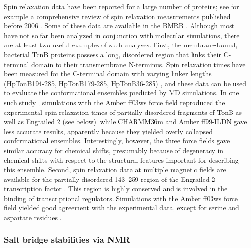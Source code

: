 \documentclass[9pt,review]{livecoms}
\begin{document}
Spin relaxation data have been reported for a large number of proteins; see for example a comprehensive review of spin relaxation measurements published before 2006 \cite{jarymowycz_fast_2006}.
Some of these data are available in the BMRB \cite{ulrich_biomagresbank_2008,romero_biomagresbank_2020}.
Although most have not so far been analyzed in conjunction with molecular simulations, there are at least two useful examples of such analyses.
First, the membrane-bound, bacterial TonB proteins possess a long, disordered region that links their C-terminal domain to their transmembrane N-terminus.
Spin relaxation times have been measured for the C-terminal domain with varying linker lengths (HpTonB194-285, HpTonB179-285, HpTonB36-285) \cite{ciragan_nmr_2020}, and these data can be used to evaluate the conformational ensembles predicted by MD simulations.
In one such study \cite{virtanen_heterogeneous_2020}, simulations with the Amber ff03ws force field reproduced the experimental spin relaxation times of partially disordered fragments of TonB as well as Engrailed 2 (see below), while CHARMM36m and Amber ff99-ILDN gave less accurate results, apparently because they yielded overly collapsed conformational ensembles.
Interestingly, however, the three force fields gave similar accuracy for chemical shifts, presumably because of degeneracy in chemical shifts with respect to the structural features important for describing this ensemble.
Second, spin relaxation data at multiple magnetic fields are available for the partially disordered 143–259 region of the Engrailed 2 transcription factor \cite{khan_distribution_2015}.
This region is highly conserved and is involved in the binding of transcriptional regulators.
Simulations with the Amber ff03ws force field yielded good agreement with the experimental data, except for serine and aspartate residues \cite{virtanen_heterogeneous_2020}.

\subsubsection{Salt bridge stabilities via NMR}
\label{sub2:salt_bridge}
\end{document}

